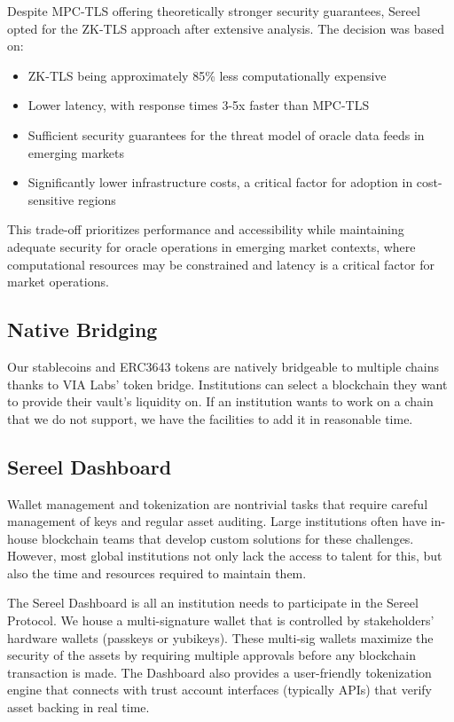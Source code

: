 \documentclass[12pt]{article}
\begin{document}
Despite MPC-TLS offering theoretically stronger security guarantees, Sereel opted for the ZK-TLS approach after extensive analysis. The decision was based on:

\begin{itemize}
  \item ZK-TLS being approximately 85\% less computationally expensive
  \item Lower latency, with response times 3-5x faster than MPC-TLS
  \item Sufficient security guarantees for the threat model of oracle data feeds in emerging markets
  \item Significantly lower infrastructure costs, a critical factor for adoption in cost-sensitive regions
\end{itemize}

This trade-off prioritizes performance and accessibility while maintaining adequate security for oracle operations in emerging market contexts, where computational resources may be constrained and latency is a critical factor for market operations.


\subsection{Native Bridging}
Our stablecoins and ERC3643 tokens are natively bridgeable to multiple chains thanks to VIA Labs' token bridge. Institutions can select a blockchain they want to provide their vault's liquidity on. If an institution wants to work on a chain that we do not support, we have the facilities to add it in reasonable time.
\subsection{Sereel Dashboard}
Wallet management and tokenization are nontrivial tasks that require careful management of keys and regular asset auditing. Large institutions often have in-house blockchain teams that develop custom solutions for these challenges. However, most global institutions not only lack the access to talent for this, but also the time and resources required to maintain them. 

The Sereel Dashboard is all an institution needs to participate in the Sereel Protocol. We house a multi-signature wallet that is controlled by stakeholders' hardware wallets (passkeys or yubikeys). These multi-sig wallets maximize the security of the assets by requiring multiple approvals before any blockchain transaction is made. The Dashboard also provides a user-friendly tokenization engine that connects with trust account interfaces (typically APIs) that verify asset backing in real time.
\end{document}
